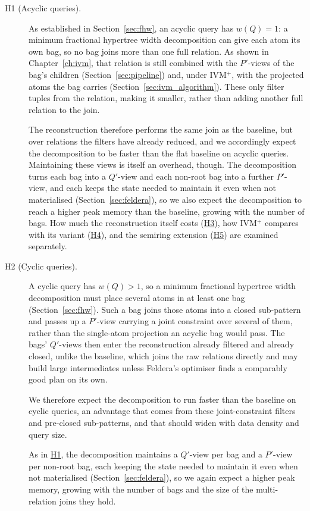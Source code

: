 \begin{description}
    \item[\hypertarget{h1}{H1 (Acyclic queries).}] As established in Section~\ref{sec:fhw}, an acyclic query has $w(Q) = 1$: a minimum fractional hypertree width decomposition can give each atom its own bag, so no bag joins more than one full relation. As shown in Chapter~\ref{ch:ivm}, that relation is still combined with the $P'$-views of the bag's children (Section~\ref{sec:pipeline}) and, under IVM$^+$, with the projected atoms the bag carries (Section~\ref{sec:ivm_algorithm}). These only filter tuples from the relation, making it smaller, rather than adding another full relation to the join.

    The reconstruction therefore performs the same join as the baseline, but over relations the filters have already reduced, and we accordingly expect the decomposition to be faster than the flat baseline on acyclic queries. Maintaining these views is itself an overhead, though. The decomposition turns each bag into a $Q'$-view and each non-root bag into a further $P'$-view, and each keeps the state needed to maintain it even when not materialised (Section~\ref{sec:feldera}), so we also expect the decomposition to reach a higher peak memory than the baseline, growing with the number of bags. How much the reconstruction itself costs (\hyperlink{h3}{H3}), how IVM$^+$ compares with its variant (\hyperlink{h4}{H4}), and the semiring extension (\hyperlink{h5}{H5}) are examined separately.

    \item[\hypertarget{h2}{H2 (Cyclic queries).}] A cyclic query has $w(Q) > 1$, so a minimum fractional hypertree width decomposition must place several atoms in at least one bag (Section~\ref{sec:fhw}). Such a bag joins those atoms into a closed sub-pattern and passes up a $P'$-view carrying a joint constraint over several of them, rather than the single-atom projection an acyclic bag would pass. The bags' $Q'$-views then enter the reconstruction already filtered and already closed, unlike the baseline, which joins the raw relations directly and may build large intermediates unless Feldera's optimiser finds a comparably good plan on its own.

    We therefore expect the decomposition to run faster than the baseline on cyclic queries, an advantage that comes from these joint-constraint filters and pre-closed sub-patterns, and that should widen with data density and query size.

    As in \hyperlink{h1}{H1}, the decomposition maintains a $Q'$-view per bag and a $P'$-view per non-root bag, each keeping the state needed to maintain it even when not materialised (Section~\ref{sec:feldera}), so we again expect a higher peak memory, growing with the number of bags and the size of the multi-relation joins they hold.


\end{description}
